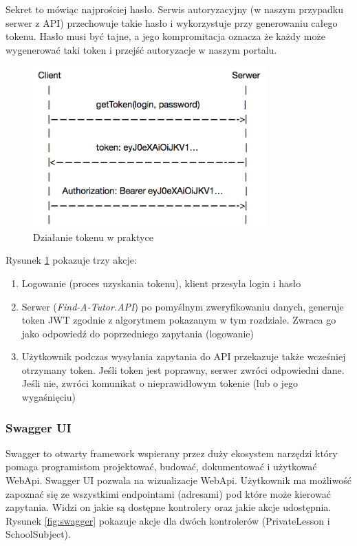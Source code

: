 \documentclass[12pt]{article}
\numberwithin{figure}{section}
\begin{document}
\begin{sloppypar}
    Sekret to mówiąc najprościej hasło. Serwis autoryzacyjny (w naszym przypadku serwer z API) przechowuje takie hasło i wykorzystuje przy generowaniu całego tokenu. Hasło musi być tajne, a jego kompromitacja oznacza że każdy może wygenerować taki token i przejść autoryzacje w naszym portalu.
    
    \begin{figure}[H] 
     	\centering
    	\includegraphics[width=0.8\textwidth]{images/chapter_3/token-diagram.png}
    	\caption{Działanie tokenu w praktyce \cite{token-diagram}}
    	\label{fig:token-diagram}
    \end{figure}
    
    Rysunek \ref{fig:token-diagram} pokazuje trzy akcje:
    \begin{enumerate}
        \item Logowanie (proces uzyskania tokenu), klient przesyła login i hasło
        \item Serwer (\textit{Find-A-Tutor.API}) po pomyślnym zweryfikowaniu danych, generuje token JWT zgodnie z algorytmem pokazanym w tym rozdziale. Zwraca go jako odpowiedź do poprzedniego zapytania (logowanie)
        \item Użytkownik podczas wysyłania zapytania do API przekazuje także wcześniej otrzymany token. Jeśli token jest poprawny, serwer zwróci odpowiedni dane. Jeśli nie, zwróci komunikat o nieprawidłowym tokenie (lub o jego wygaśnięciu)
    \end{enumerate}
    
\subsubsection{Swagger UI}
Swagger to otwarty framework wspierany przez duży ekosystem narzędzi który pomaga programistom projektować, budować, dokumentować i użytkować WebApi. 
Swagger UI pozwala na wizualizacje WebApi. Użytkownik ma możliwość zapoznać się ze wszystkimi endpointami (adresami) pod które może kierować zapytania. Widzi on jakie są dostępne kontrolery oraz jakie akcje udostępnia. Rysunek \ref{fig:swagger} pokazuje akcje dla dwóch kontrolerów (PrivateLesson i SchoolSubject). 
    

\end{sloppypar}
\end{document}
